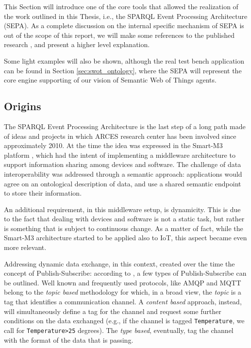 This Section will introduce one of the core tools that allowed the realization of the work outlined in this Thesis, i.e., the SPARQL Event Processing Architecture (SEPA). As a complete discussion on the internal specific mechanism of SEPA is out of the scope of this report, we will make some references to the published research \cite{roffia2018dynamic}, and present a higher level explanation.

Some light examples will also be shown, although the real test bench application can be found in Section \ref{sec:swot_ontology}, where the SEPA will represent the core engine supporting of our vision of Semantic Web of Things agents.

\subsection{Origins}

The SPARQL Event Processing Architecture is the last step of a long path made of ideas and projects in which ARCES research center has been involved since approximately 2010. At the time the idea was expressed in the Smart-M3 platform \cite{honkola2010smart}, which had the intent of implementing a middleware architecture to support information sharing among devices and software. The challenge of data interoperability was addressed through a semantic approach: applications would agree on an ontological description of data, and use a shared semantic endpoint to store their information.

An additional requirement, in this middleware setup, is dynamicity. This is due to the fact that dealing with devices and software is not a static task, but rather is something that is subject to continuous change. As a matter of fact, while the Smart-M3 architecture started to be applied also to IoT, this aspect became even more relevant. 

Addressing dynamic data exchange, in this context, created over the time the concept of Publish-Subscribe: according to \cite{eugster2003many}, a few types of Publish-Subscribe can be outlined. Well known and frequently used protocols, like AMQP and MQTT belong to the \textit{topic based} methodology for which, in a broad view, the \textit{topic} is a tag that identifies a communication channel. A \textit{content based} approach, instead, will simultaneously define a tag for the channel and request some further conditions on the data exchanged (e.g., if the channel is tagged \texttt{Temperature}, we call for \texttt{Temperature>25} degrees). The \textit{type based}, eventually, tag the channel with the format of the data that is passing.


